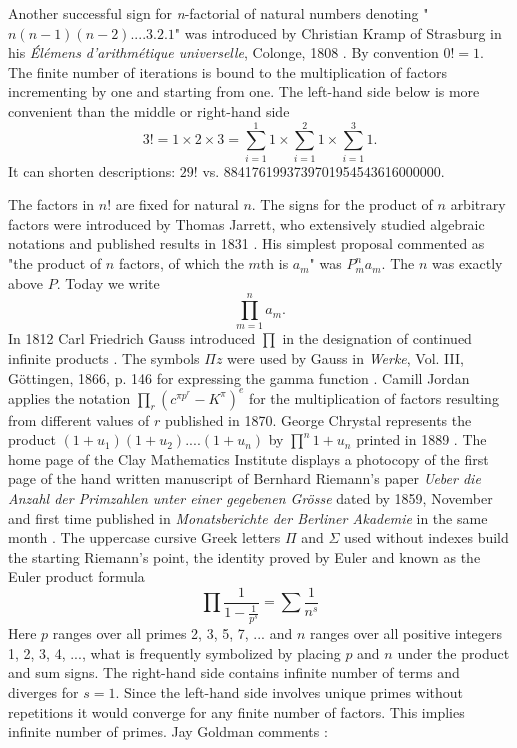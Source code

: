 \documentclass{article}
\begin{document}
Another successful sign for \textit{n}-factorial of natural numbers denoting "$n(n - 1)(n - 2) .... 3.2.1$" was introduced by Christian Kramp of Strasburg in his \textit{\'{E}l\'{e}mens d'arithm\'{e}tique universelle}, Colonge, 1808 \cite[item 448, p. 72]{cajori}. By convention $0! = 1$. The finite number of iterations is bound to the multiplication of factors incrementing by one and starting from one. The left-hand side below is more convenient than the middle or right-hand side
\begin{displaymath}
3! = 1 \times 2 \times 3 = \sum_{i=1}^{1}1 \times \sum_{i=1}^{2}1 \times \sum_{i=1}^{3}1.
\end{displaymath}
It can shorten descriptions: $29!$ vs. 8841761993739701954543616000000.

The factors in $n!$ are fixed for natural $n$. The signs for the product of $n$ arbitrary factors were introduced by Thomas Jarrett, who extensively studied algebraic notations and published results in 1831 \cite[item 448, pp. 69 - 71]{cajori}. His simplest proposal commented as "the product of $n$ factors, of which the $m$th is $a_m$" was $P_{m}^{n}a_{m}$. The $n$ was exactly above $P$. Today we write
\begin{displaymath}
\prod_{m=1}^{n} a_m.
\end{displaymath}
In 1812 Carl Friedrich Gauss introduced $\prod$ in the designation of continued infinite products \cite[item 451, p. 78]{cajori}. The symbols $\Pi{z}$ were used by Gauss in \textit{Werke}, Vol. III, G\"{o}ttingen, 1866, p. 146 for expressing the gamma function \cite[item 650, p. 272]{cajori}. Camill Jordan applies the notation $\prod_r(c^{\pi{p^r}}-K^\pi)^e$ for the multiplication of factors resulting from different values of $r$ published in 1870. George Chrystal represents the product $(1 + u_1)(1 + u_2)....(1 + u_n)$ by $\prod^n{1 + u_n}$ printed in 1889 \cite[item 451, p. 79]{cajori}. The home page of the Clay Mathematics Institute displays a photocopy of the first page of the hand written manuscript of Bernhard Riemann's paper \textit{Ueber die Anzahl der Primzahlen unter einer gegebenen Gr\"{o}sse} dated by 1859, November and first time published in \textit{Monatsberichte der Berliner Akademie} in the same month \cite{clay}. The uppercase cursive Greek letters $\Pi$ and $\Sigma$ used without indexes build the starting Riemann's point, the identity proved by Euler and known as the Euler product formula
\begin{displaymath}
\prod{\frac{1}{1 - \frac{1}{p^s}}} = \sum{\frac{1}{n^s}}
\end{displaymath}
Here $p$ ranges over all primes 2, 3, 5, 7, ... and $n$ ranges over all positive integers 1, 2, 3, 4, ..., what is frequently symbolized by placing $p$ and $n$ under the product and sum signs. The right-hand side contains infinite number of terms and diverges for $s = 1$. Since the left-hand side involves unique primes without repetitions it would converge for any finite number of factors. This implies infinite number of primes. Jay Goldman comments \cite[p. 36]{goldman}:
\end{document}
